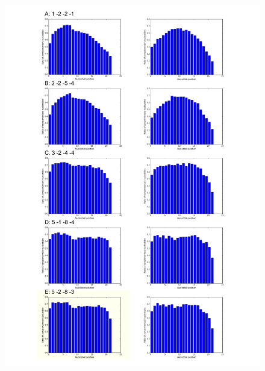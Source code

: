 \documentclass[11pt, a4paper, twoside]{book}
\begin{document}
\begin{figure}
\vspace{-1cm}
\hspace{-2cm}
\includegraphics[scale=0.75]{results/compl1.pdf}
\end{figure}
\end{document}
